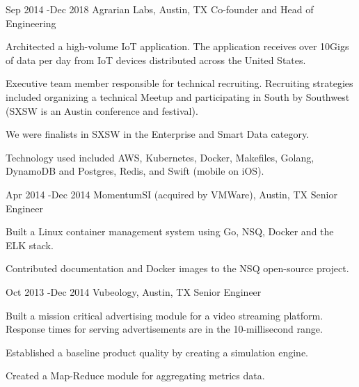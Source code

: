 \documentclass[10pt]{article} %
\begin{document}

\job
{Sep 2014 -}{Dec 2018}
{Agrarian Labs, Austin, TX}
{}
{Co-founder and Head of Engineering}
{

\begin{itemize-noindent}
\item{Architected a high-volume IoT application.  The application receives over 10Gigs of data per day from IoT devices distributed across the United States.}
\item{Executive team member responsible for technical recruiting. Recruiting strategies included organizing a technical Meetup and participating in South by Southwest (SXSW is an Austin conference and festival).}
\item{We were finalists in SXSW in the Enterprise and Smart Data category.}
\item{Technology used included AWS, Kubernetes, Docker, Makefiles, Golang, DynamoDB and Postgres, Redis, and Swift (mobile on iOS).}
\end{itemize-noindent}
}


\job
{Apr 2014 -}{Dec 2014}
{MomentumSI (acquired by VMWare), Austin, TX}
{}
{Senior Engineer}
{
\begin{itemize-noindent}
\item{Built a Linux container management system using Go, NSQ, Docker and the ELK stack.}
\item{Contributed documentation and Docker images to the NSQ open-source project.}
\end{itemize-noindent}
}


\job
{Oct 2013 -}{Dec 2014}
{Vubeology, Austin, TX}
{}
{Senior Engineer}
{
\begin{itemize-noindent}
\item{Built a mission critical advertising module for a video streaming platform. Response times for serving advertisements are in the 10-millisecond range.} 
\item{Established a baseline product quality by creating a simulation engine.} 
\item{Created a Map-Reduce module for aggregating metrics data.}
\end{itemize-noindent}
}

\end{document}
